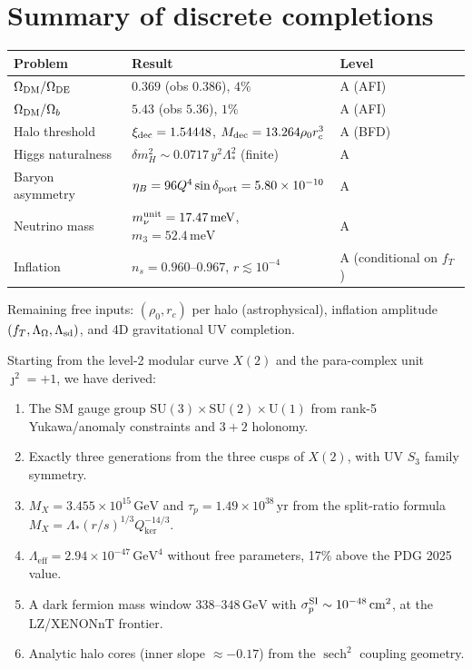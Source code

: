 \documentclass[12pt]{article}
\theoremstyle{plain}
\theoremstyle{definition}
\numberwithin{equation}{section}
\newcommand{\eff}{\mathrm{eff}}
\DeclareMathOperator{\sech}{sech}
\begin{document}
\section{Summary of discrete completions}\label{sec:discrete_summary}

\begin{center}
\begin{tabular}{p{3.5cm}p{5cm}p{3cm}}
\toprule
Problem & Result & Level\\
\midrule
$\Omega_{\rm DM}/\Omega_{\rm DE}$ & $0.369$ (obs $0.386$), $4\%$ & A (AFI)\\
$\Omega_{\rm DM}/\Omega_b$ & $5.43$ (obs $5.36$), $1\%$ & A (AFI)\\
Halo threshold & $\xi_{\rm dec}=1.54448$, $M_{\rm dec}=13.264\rho_0 r_c^3$ & A (BFD)\\
Higgs naturalness & $\delta m_H^2\sim 0.0717\,y^2\Lambda_*^2$ (finite) & A\\
Baryon asymmetry & $\eta_B=96Q^4\sin\delta_{\rm port}=5.80\times10^{-10}$ & A\\
Neutrino mass & $m_\nu^{\rm unit}=17.47\,\mathrm{meV}$, $m_3=52.4\,\mathrm{meV}$ & A\\
Inflation & $n_s=0.960$--$0.967$, $r\lesssim10^{-4}$ & A (conditional on $f_T$)\\
\bottomrule
\end{tabular}
\end{center}

Remaining free inputs: $(\rho_0, r_c)$ per halo (astrophysical), inflation amplitude $(f_T, \Lambda_\Omega, \Lambda_{\rm sd})$, and 4D gravitational UV completion.



Starting from the level-2 modular curve $X(2)$ and the para-complex unit
$\jmath^2=+1$, we have derived:

\begin{enumerate}
\item The SM gauge group $\mathrm{SU}(3)\times\mathrm{SU}(2)\times\mathrm{U}(1)$
  from rank-5 Yukawa/anomaly constraints and $3+2$ holonomy.
\item Exactly three generations from the three cusps of $X(2)$,
  with UV $S_3$ family symmetry.
\item $M_X=3.455\times10^{15}\,\mathrm{GeV}$ and $\tau_p=1.49\times10^{38}\,\mathrm{yr}$
  from the split-ratio formula $M_X=\Lambda_*(r/s)^{1/3}Q_{\ker}^{-14/3}$.
\item $\Lambda_\eff=2.94\times10^{-47}\,\mathrm{GeV}^4$ without free parameters,
  17\% above the PDG 2025 value.
\item A dark fermion mass window $338$--$348\,\mathrm{GeV}$ with
  $\sigma_p^{\rm SI}\sim10^{-48}\,\mathrm{cm}^2$, at the LZ/XENONnT frontier.
\item Analytic halo cores (inner slope $\approx-0.17$) from the $\sech^2$
  coupling geometry.
\end{enumerate}
\end{document}
